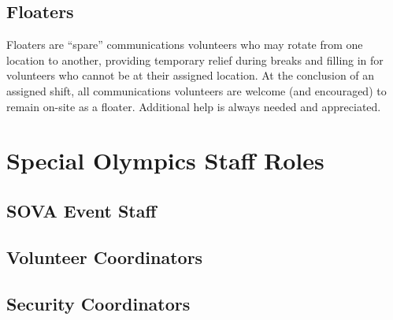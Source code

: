\documentclass[pdflatex,letterpaper,twoside,12pt]{book}
\begin{document}
\section{Floaters}

Floaters are ``spare'' communications volunteers who may rotate from one location to another, providing temporary relief during breaks and filling in for volunteers who cannot be at their assigned location.  At the conclusion of an assigned shift, all communications volunteers are welcome (and encouraged) to remain on-site as a floater.  Additional help is always needed and appreciated.


\chapter{Special Olympics Staff Roles}

\section{SOVA Event Staff}


\section{Volunteer Coordinators}


\section{Security Coordinators}

\end{document}
